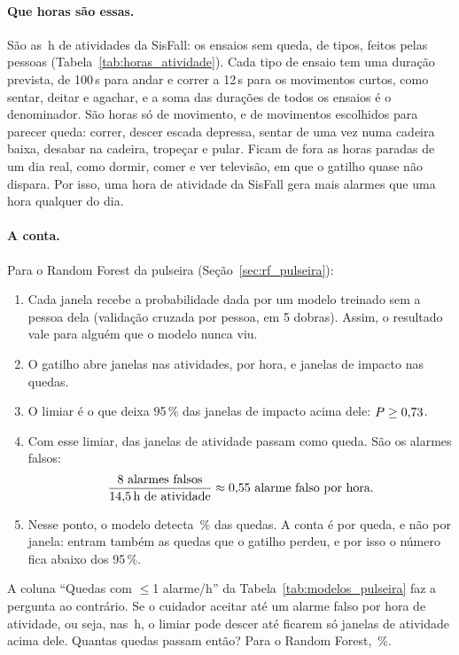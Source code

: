 \paragraph{Que horas são essas.} São as \adlHoras\,h de atividades da SisFall: os
\adlEnsaios{} ensaios sem queda, de \adlTipos{} tipos, feitos pelas \sisPessoas{} pessoas
(Tabela~\ref{tab:horas_atividade}). Cada tipo de ensaio tem uma duração prevista, de 100\,s
para andar e correr a 12\,s para os movimentos curtos, como sentar, deitar e agachar, e a soma
das durações de todos os ensaios é o denominador. São horas só de movimento, e de movimentos escolhidos para parecer queda: correr,
descer escada depressa, sentar de uma vez numa cadeira baixa, desabar na cadeira, tropeçar e
pular. Ficam de fora as horas paradas de um dia real, como dormir, comer e ver televisão, em
que o gatilho quase não dispara. Por isso, uma hora de atividade da SisFall gera mais alarmes
que uma hora qualquer do dia.

\begin{table}[H]
\centering
\caption{As horas de atividade da SisFall, o denominador da métrica.}
\label{tab:horas_atividade}
\small

\end{table}

\paragraph{A conta.} Para o Random Forest da pulseira (Seção~\ref{sec:rf_pulseira}):
\begin{enumerate}
  \item Cada janela recebe a probabilidade dada por um modelo treinado sem a pessoa dela
        (validação cruzada por pessoa, em 5 dobras). Assim, o resultado vale para alguém que o
        modelo nunca viu.
  \item O gatilho abre \adlJanelas{} janelas nas atividades, \gatilhoDisparosH{} por hora, e
        \impactos{} janelas de impacto nas \quedasEnsaios{} quedas.
  \item O limiar é o que deixa 95\,\% das janelas de impacto acima dele: $P \ge \text{0,73}$.
  \item Com esse limiar, \rfAlarmesN{} das \adlJanelas{} janelas de atividade passam como
        queda. São os alarmes falsos:
        \[
          \frac{\text{8{} alarmes falsos}}{\text{14,5\,h de atividade}}
          \approx \text{0,55{} alarme falso por hora.}
        \]
  \item Nesse ponto, o modelo detecta \rfSensEnsaio\,\% das quedas. A conta é por queda, e não
        por janela: entram também as quedas que o gatilho perdeu, e por isso o número fica abaixo
        dos 95\,\%.
\end{enumerate}
A coluna ``Quedas com $\le$1 alarme/h'' da Tabela~\ref{tab:modelos_pulseira} faz a pergunta ao
contrário. Se o cuidador aceitar até um alarme falso por hora de atividade, ou seja,
\alarmesPermitidos{} nas \adlHoras\,h, o limiar pode descer até ficarem só
\alarmesPermitidos{} janelas de atividade acima dele. Quantas quedas passam então? Para o
Random Forest, \rfQuedas\,\%.

